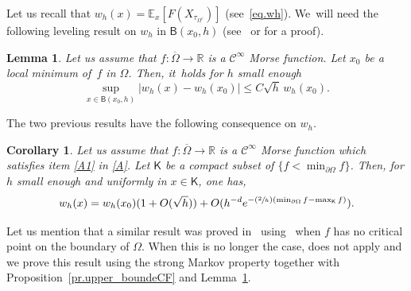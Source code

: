 \documentclass[JEP,XML,SOM,Unicode,NoEqCountersInSection,NoFloatCountersInSection,published]{cedram}
\newcommand{\Psfrac}[2]{(\sfrac{#1}{#2})}
\theoremstyle{plain}
\newtheorem{lemma}[proposition]{Lemma}
\newtheorem{corollary}[proposition]{Corollary}
\theoremstyle{definition}
\begin{document}
Let us recall that $w_h(x)=\mathbb E_{x} [F(X_{\tau_{\Omega^c}})]$ (see~\eqref{eq.wh}). We~will need the following leveling result on $w_h$ in $\mathsf
B(x_0,h)$ (see~\cite[Lem.\,1]{kamin1979elliptic} or \cite[Lem.\,3]{NePC} for a proof).

\begin{lemma}\label{le.upper_boundeF}
Let us assume that $f:\overline \Omega\to \mathbb R$ is a $\mathcal C^\infty$ Morse function. Let $x_0$ be a local minimum of~$f$ in $\Omega$.
Then, it~holds for $h$ small enough
\[
\sup_{x\in { \mathsf B(x_0,h)}} \vert w_h(x) -w_h(x_0)\vert\le C \sqrt h \, w_h(x_0).
\]
\end{lemma}

The two previous results have the following consequence on $w_h$.

\begin{corollary}\label{co.Px}
Let us assume that $f:\overline \Omega\to \mathbb R$ is a $\mathcal C^\infty$ Morse function which satisfies item \eqref{A1} in \ref{A}.
Let $\mathsf K$ be a compact subset of $\{f<\min_{\partial \Omega}f\}$.
Then, for $h$ small enough and uniformly in $x\in \mathsf K$, one has,
\[
w_h(x) =w_h(x_0)(1+O(\sqrt h))+ O(h^{-d}e^{-\Psfrac 2h (\min_{\partial \Omega }f-\max_{\mathsf K} f)}).
\]
\end{corollary}

Let us mention that a similar result was proved in~\cite[\S5.1.4]{DLLN} using~\cite[Th.\,1]{eizenberg-90} when $f$ has no critical point on the boundary of $\Omega$. When this is no longer the case, \cite[Th.\,1]{eizenberg-90} does not apply and we prove this result using the strong Markov property together with Proposition~\ref{pr.upper_boundeCF} and Lemma~\ref{le.upper_boundeF}.
\end{document}
